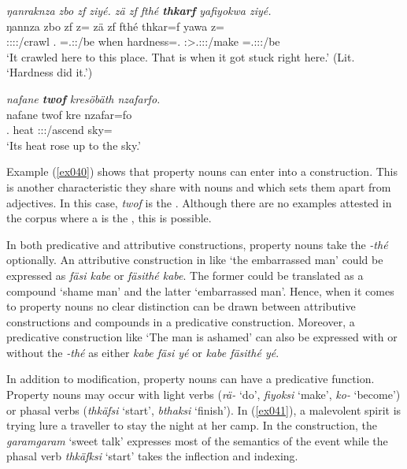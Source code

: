 \begin{exe}
	\ex \emph{ŋanraknza zbo zf ziyé. zä zf fthé \textbf{thkarf} yafiyokwa ziyé.}\\
	\gll ŋannza zbo zf z= zä zf fthé thkar=f yawa z=\\
	\Stsg:\Sbj:\Pst:\Ipfv:\Venit/crawl \Prox.\All{} \Imm{} \Prox=\Tsg.\Masc:\Sbj:\Nonpast/be \Prox{} \Imm{} when hardness=\Erg.\Sg{} \Stsg:\Sbj>\Tsg.\Masc:\Obj:\Pst:\Ipfv/make \Prox=\Tsg.\Masc:\Sbj:\Nonpast:\Ipfv/be\\
	\trans `It crawled here to this place. That is when it got stuck right here.' (Lit. `Hardness did it.')
	\label{ex035}
\end{exe}
\begin{exe}
	\ex \emph{nafane \textbf{twof} kresöbäth nzafarfo.}\\
	\gll nafane twof kre nzafar=fo\\
	\Tsg{}.\Poss{} heat \Stsg{}:\Sbj:\Irr:\Pfv{}/ascend sky=\All{}\\
	\trans `Its heat rose up to the sky.'
	\label{ex040}
\end{exe}

Example (\ref{ex040}) shows that property nouns can enter into a  construction. This is another characteristic they share with nouns and which sets them apart from adjectives. In this case, \emph{twof} is the . Although there are no examples attested in the corpus where a  is the , this is possible.%

In both predicative and attributive constructions, property nouns take the  \emph{-thé} optionally. An attributive construction in  like `the embarrassed man' could be expressed as \emph{fäsi kabe} or \emph{fäsithé kabe}. The former could be translated as a compound `shame man' and the latter `embarrassed man'. Hence, when it comes to property nouns no clear distinction can be drawn between attributive constructions and  compounds in a predicative construction. Moreover, a predicative construction like  `The man is ashamed' can also be expressed with or without the  \emph{-thé} as either \emph{kabe fäsi yé} or \emph{kabe fäsithé yé}.%

In addition to  modification, property nouns can have a predicative function. Property nouns may occur with light verbs (\emph{rä-} `do', \emph{fiyoksi} `make', \emph{ko-} `become') or phasal verbs (\emph{thkäfsi} `start', \emph{bthaksi} `finish'). In (\ref{ex041}), a malevolent spirit is trying lure a traveller to stay the night at her camp. In the construction, the  \emph{garamgaram} `sweet talk' expresses most of the semantics of the event while the phasal verb \emph{thkäfksi} `start' takes the inflection and indexing.

